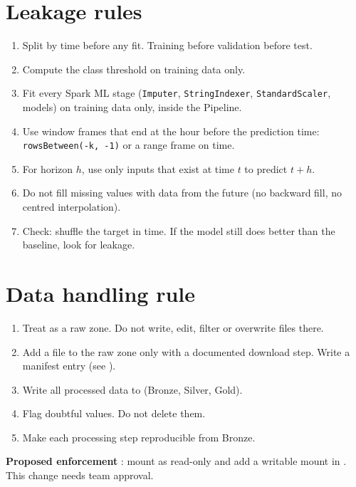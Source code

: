 \documentclass[11pt]{article}
\begin{document}
\section{Leakage rules}
\label{sec:leak}
\begin{enumerate}
  \item Split by time before any fit. Training before validation before test.
  \item Compute the class threshold on training data only.
  \item Fit every Spark ML stage (\texttt{Imputer}, \texttt{StringIndexer}, \texttt{StandardScaler}, models) on training data only, inside the Pipeline.
  \item Use window frames that end at the hour before the prediction time: \texttt{rowsBetween(-k, -1)} or a range frame on time.
  \item For horizon $h$, use only inputs that exist at time $t$ to predict $t+h$.
  \item Do not fill missing values with data from the future (no backward fill, no centred interpolation).
  \item Check: shuffle the target in time. If the model still does better than the baseline, look for leakage.
\end{enumerate}

\section{Data handling rule}
\begin{enumerate}
  \item Treat  as a raw zone. Do not write, edit, filter or overwrite files there.
  \item Add a file to the raw zone only with a documented download step. Write a manifest entry (see ).
  \item Write all processed data to  (Bronze, Silver, Gold).
  \item Flag doubtful values. Do not delete them.
  \item Make each processing step reproducible from Bronze.
\end{enumerate}
\textbf{Proposed enforcement} \sProposed: mount  as read-only and add a writable  mount in . This change needs team approval.
\end{document}
